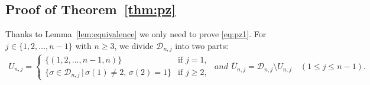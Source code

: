 \documentclass[12pt,reqno]{amsart}
\numberwithin{equation}{section}
\newcounter{num}
\def\D{\mathcal{D}}
\begin{document}
%
%
%

\subsection{Proof of Theorem~\ref{thm:pz}}
Thanks to Lemma~\ref{lem:equivalence} we only need to prove \eqref{eq:pz1}.
For $j\in \{1, 2, \ldots, n-1\}$ with $n\geq 3$, we divide $\D_{n,j}$ into two parts:
\begin{subequations}
\begin{align}\label{Udef}
U_{n,j}=\begin{cases}
\{(1,2, \ldots, n-1, n)\}& \textrm{if $j=1$},\\
\{\sigma\in\D_{n,j}\,|\,\sigma(1)\neq2,\, \sigma(2)=1\}
& \textrm{if $j\geq 2$},
\end{cases} 
\end{align}
and 
\begin{align}\label{Edef}
\overline{U}_{n,j}=\D_{n,j} \setminus U_{n,j}
\quad (1\leq j\leq n-1).
\end{align}
\end{subequations}
\end{document}
